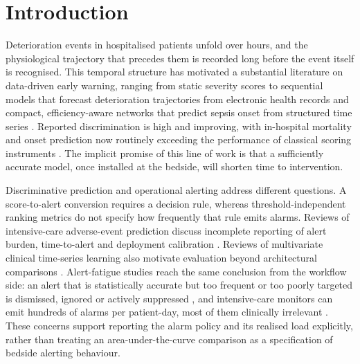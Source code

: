 \section{Introduction}
\label{sec:intro}

Deterioration events in hospitalised patients unfold over hours, and the physiological trajectory that precedes them is recorded long before the event itself is recognised. This temporal structure has motivated a substantial literature on data-driven early warning, ranging from static severity scores to sequential models that forecast deterioration trajectories from electronic health records \citep{xiumin2026machine} and compact, efficiency-aware networks that predict sepsis onset from structured time series \citep{taparugssanagorn2026lightweight}. Reported discrimination is high and improving, with in-hospital mortality and onset prediction now routinely exceeding the performance of classical scoring instruments \citep{yong2024deep}. The implicit promise of this line of work is that a sufficiently accurate model, once installed at the bedside, will shorten time to intervention.

Discriminative prediction and operational alerting address different questions. A score-to-alert conversion requires a decision rule, whereas threshold-independent ranking metrics do not specify how frequently that rule emits alarms. Reviews of intensive-care adverse-event prediction discuss incomplete reporting of alert burden, time-to-alert and deployment calibration \citep{wang2026deep}. Reviews of multivariate clinical time-series learning also motivate evaluation beyond architectural comparisons \citep{hernandezdiaz2026deep,swinckels2024deep}. Alert-fatigue studies reach the same conclusion from the workflow side: an alert that is statistically accurate but too frequent or too poorly targeted is dismissed, ignored or actively suppressed \citep{ray2026alert,jaidev2026sepsis}, and intensive-care monitors can emit hundreds of alarms per patient-day, most of them clinically irrelevant \citep{ramachandran2026sigmamedstat}. These concerns support reporting the alarm policy and its realised load explicitly, rather than treating an area-under-the-curve comparison as a specification of bedside alerting behaviour.

